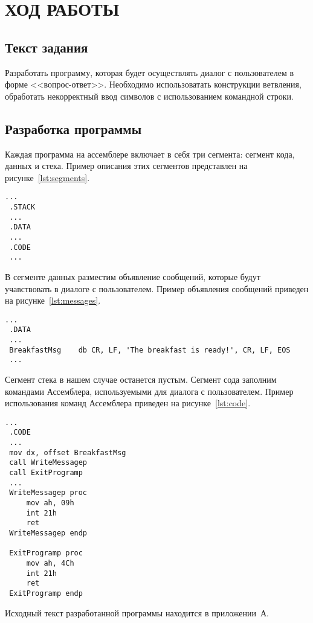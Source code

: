 \section{ХОД РАБОТЫ}

\subsection{Текст задания}

Разработать программу, которая будет осуществлять диалог с пользователем в форме
<<вопрос-ответ>>. Необходимо использоватать конструкции ветвления, обработать
некорректный ввод символов с использованием командной строки.

\subsection{Разработка программы}

Каждая программа на ассемблере включает в себя три сегмента: сегмент кода,
данных и стека. Пример описания этих сегментов представлен
на рисунке~\ref{lst:segments}.
\begin{lstlisting}[caption={Пример объявления сегмента кода, данных и стека в
программе на языке Ассемблер},label=lst:segments]
 ...
 .STACK
 ...
 .DATA
 ...
 .CODE
 ...
\end{lstlisting}

В сегменте данных разместим объявление сообщений, которые будут учавствовать в
диалоге с пользователем. Пример объявления сообщений приведен на
рисунке~\ref{lst:messages}.
\begin{lstlisting}[caption={Пример объявления сообщений, используемых
 для диалога с пользователем},label=lst:messages]
 ...
 .DATA
 ...
 BreakfastMsg    db CR, LF, 'The breakfast is ready!', CR, LF, EOS
 ...
\end{lstlisting}

Сегмент стека в нашем случае останется пустым. Сегмент сода заполним командами
Ассемблера, используемыми для диалога с пользователем. Пример использования
команд Ассемблера приведен на рисунке~\ref{lst:code}.
\begin{lstlisting}[caption={Пример команд Ассемблера, используемых
 для диалога с пользователем},label=lst:code]
 ...
 .CODE
 ...
 mov dx, offset BreakfastMsg
 call WriteMessagep
 call ExitProgramp
 ...
 WriteMessagep proc
     mov ah, 09h
     int 21h
     ret
 WriteMessagep endp

 ExitProgramp proc
     mov ah, 4Ch
     int 21h
     ret
 ExitProgramp endp
\end{lstlisting}

Исходный текст разработанной программы находится в приложении~А.
